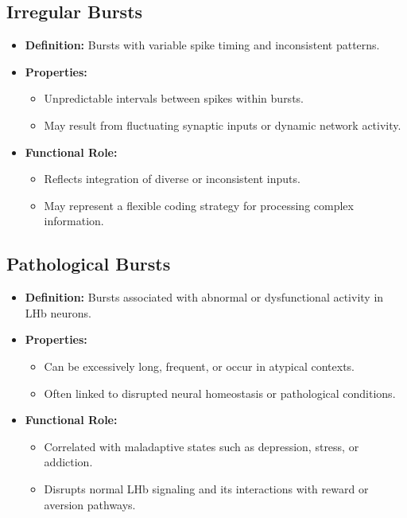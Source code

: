 \documentclass[a4paper,9pt]{extarticle}
\begin{document}
\subsection{Irregular Bursts}
\begin{itemize}
    \item \textbf{Definition:} Bursts with variable spike timing and inconsistent patterns.
    \item \textbf{Properties:}
        \begin{itemize}
            \item Unpredictable intervals between spikes within bursts.
            \item May result from fluctuating synaptic inputs or dynamic network activity.
        \end{itemize}
    \item \textbf{Functional Role:} 
        \begin{itemize}
            \item Reflects integration of diverse or inconsistent inputs.
            \item May represent a flexible coding strategy for processing complex information.
        \end{itemize}
\end{itemize}

\subsection{Pathological Bursts}
\begin{itemize}
    \item \textbf{Definition:} Bursts associated with abnormal or dysfunctional activity in LHb neurons.
    \item \textbf{Properties:}
        \begin{itemize}
            \item Can be excessively long, frequent, or occur in atypical contexts.
            \item Often linked to disrupted neural homeostasis or pathological conditions.
        \end{itemize}
    \item \textbf{Functional Role:} 
        \begin{itemize}
            \item Correlated with maladaptive states such as depression, stress, or addiction.
            \item Disrupts normal LHb signaling and its interactions with reward or aversion pathways.
        \end{itemize}
\end{itemize}
\end{document}
